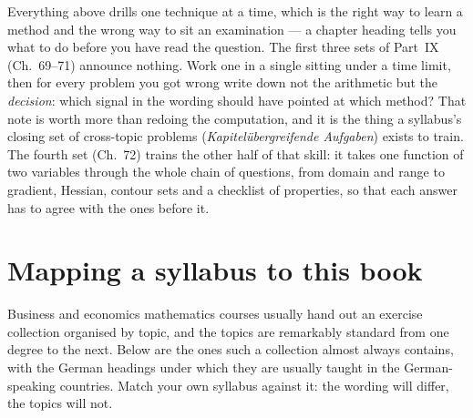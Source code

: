 Everything above drills one technique at a time, which is the right way to
learn a method and the wrong way to sit an examination --- a chapter heading
tells you what to do before you have read the question. The first three
sets of Part~IX (Ch.~69--71) announce nothing. Work one in a single sitting under a
time limit, then for every problem you got wrong write down not the
arithmetic but the \emph{decision}: which signal in the wording should have
pointed at which method? That note is worth more than redoing the
computation, and it is the thing a syllabus's closing set of cross-topic
problems (\emph{Kapitel\"ubergreifende Aufgaben}) exists to train.
The fourth set (Ch.~72) trains the other half of that skill: it takes one
function of two variables through the whole chain of questions, from domain
and range to gradient, Hessian, contour sets and a checklist of properties,
so that each answer has to agree with the ones before it.

\section*{Mapping a syllabus to this book}

Business and economics mathematics courses usually hand out an exercise
collection organised by topic, and the topics are remarkably standard from
one degree to the next. Below are the ones such a collection almost always
contains, with the German headings under which they are usually taught in
the German-speaking countries. Match your own syllabus against it: the
wording will differ, the topics will not.

